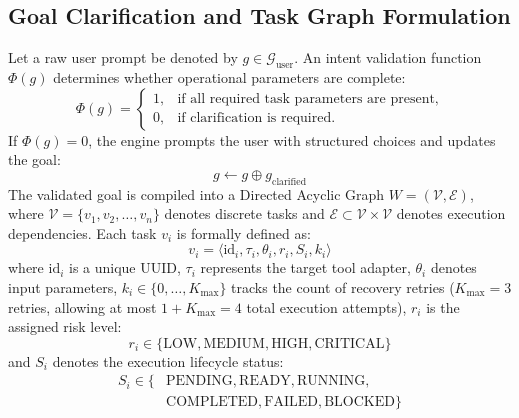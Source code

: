 \documentclass[conference]{IEEEtran}
\begin{document}
\subsection{Goal Clarification and Task Graph Formulation}
Let a raw user prompt be denoted by $g \in \mathcal{G}_{\text{user}}$. An intent validation function $\Phi(g)$ determines whether operational parameters are complete:
\begin{equation}
\Phi(g) =
\begin{cases}
1, & \text{if all required task parameters are present,} \\
0, & \text{if clarification is required.}
\end{cases}
\end{equation}
If $\Phi(g)=0$, the engine prompts the user with structured choices and updates the goal:
\begin{equation}
g \leftarrow g \oplus g_{\text{clarified}}
\end{equation}
The validated goal is compiled into a Directed Acyclic Graph $W = (\mathcal{V}, \mathcal{E})$, where $\mathcal{V} = \{v_1, v_2, \dots, v_n\}$ denotes discrete tasks and $\mathcal{E} \subset \mathcal{V} \times \mathcal{V}$ denotes execution dependencies. Each task $v_i$ is formally defined as:
\begin{equation}
v_i = \langle \text{id}_i, \tau_i, \theta_i, r_i, S_i, k_i \rangle
\end{equation}
where $\text{id}_i$ is a unique UUID, $\tau_i$ represents the target tool adapter, $\theta_i$ denotes input parameters, $k_i \in \{0, \dots, K_{\text{max}}\}$ tracks the count of recovery retries ($K_{\text{max}} = 3$ retries, allowing at most $1 + K_{\text{max}} = 4$ total execution attempts), $r_i$ is the assigned risk level:
\begin{equation}
r_i \in \{\text{LOW}, \text{MEDIUM}, \text{HIGH}, \text{CRITICAL}\}
\end{equation}
and $S_i$ denotes the execution lifecycle status:
\begin{equation}
\begin{aligned}
S_i \in \{&\text{PENDING}, \text{READY}, \text{RUNNING}, \\
          &\text{COMPLETED}, \text{FAILED}, \text{BLOCKED}\}
\end{aligned}
\end{equation}
\end{document}
